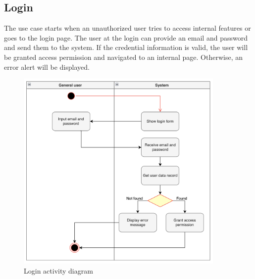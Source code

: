 \subsection{Login}
The use case starts when an unauthorized user tries to access internal features or goes to the login page. The user at the login can provide an email and password and send them to the system. If the credential information is valid, the user will be granted access permission and navigated to an internal page. Otherwise, an error alert will be displayed.
\begin{figure}[H]
  \centering
  \includegraphics[width=0.9\textwidth]{Figures/login.png}
  \caption{Login activity diagram}
  \label{fig:login}
\end{figure}
\newpage

